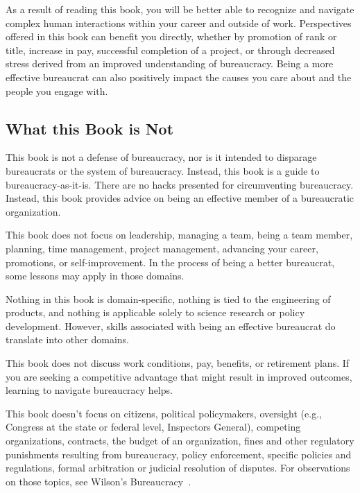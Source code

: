 As a result of reading this book, you will be better able to recognize and navigate complex human interactions within your career and outside of work. Perspectives offered in this book can benefit you directly, whether by promotion of rank or title, increase in pay, successful completion of a project, or through decreased stress derived from an improved understanding of  bureaucracy. Being a more effective bureaucrat can also positively impact the causes you care about and the people you engage with.





\subsection*{What this Book is Not}

This book is not a defense of bureaucracy, nor is it intended to disparage bureaucrats or the system of bureaucracy. Instead, this book is a guide to bureaucracy-as-it-is. There are no hacks presented for circumventing bureaucracy. Instead, this book provides advice on being an effective member of a bureaucratic organization.

This book does not focus on leadership, managing a team, being a team member, planning, time management, project management, advancing your career, promotions, or self-improvement. In the process of being a better bureaucrat, some lessons may apply in those domains.


Nothing in this book is domain-specific, nothing is tied to the engineering of products, and nothing is applicable solely to science research or policy development. However, skills associated with being an effective bureaucrat do translate into other domains.


This book does not discuss work conditions, pay, benefits, or retirement plans. If you are seeking a competitive advantage that might result in improved outcomes, learning to navigate bureaucracy helps.


This book doesn't focus on citizens, political policymakers, oversight (e.g., Congress at the state or federal level, Inspectors General), competing organizations, contracts, the budget of an organization, fines and other regulatory punishments resulting from bureaucracy, policy enforcement, specific policies and regulations, formal arbitration or judicial resolution of disputes. For observations on those topics, see Wilson's Bureaucracy~\cite{1991_Wilson}. 


